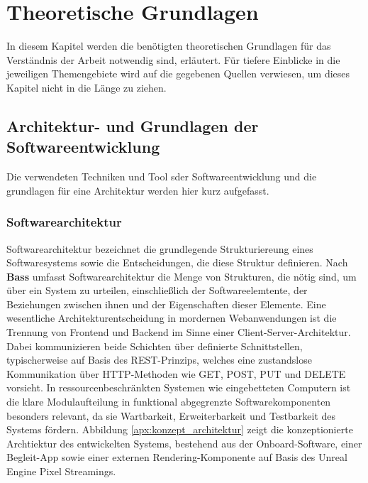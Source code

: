 

\chapter{Theoretische Grundlagen}
\label{ch:theogrundlagen}

In diesem Kapitel werden die benötigten theoretischen Grundlagen für das Verständnis der Arbeit notwendig sind, erläutert. Für tiefere Einblicke in die jeweiligen Themengebiete wird auf die gegebenen Quellen verwiesen, um dieses Kapitel nicht in die Länge zu ziehen.

\section{Architektur- und Grundlagen der Softwareentwicklung}
\label{sec:SoftwarearchiGrund}
Die verwendeten Techniken und Tool sder Softwareentwicklung und die grundlagen für eine Architektur werden hier kurz aufgefasst.

\subsection{Softwarearchitektur}
\label{subsec:Softwarearchitektur}
Softwarearchitektur bezeichnet die grundlegende Strukturiereung eines Softwaresystems sowie die Entscheidungen, die diese Struktur definieren. Nach \textbf{Bass} umfasst Softwarearchitektur die Menge von Strukturen, die nötig sind, um über ein System zu urteilen, einschließlich der Softwareelemtente, der Beziehungen zwischen ihnen und der Eigenschaften dieser Elemente.\autocite[vgl. S.2f]{bassSoftwareArchitecturePractice2022} Eine wesentliche Architekturentscheidung in mordernen Webanwendungen ist die Trennung von Frontend und Backend im Sinne einer Client-Server-Architektur. Dabei kommunizieren beide Schichten über definierte Schnittstellen, typischerweise auf Basis des \ac{REST}-Prinzips, welches eine zustandslose Kommunikation über HTTP-Methoden wie GET, POST, PUT und DELETE vorsieht.\autocite[vgl. Chapter 5]{fieldingArchitecturalStylesDesign}
\newpage
In ressourcenbeschränkten Systemen wie eingebetteten Computern ist die klare Modulaufteilung in funktional abgegrenzte Softwarekomponenten besonders relevant, da sie Wartbarkeit, Erweiterbarkeit und Testbarkeit des Systems fördern. Abbildung \ref{apx:konzept_architektur} zeigt die konzeptionierte Archtiektur des entwickelten Systems, bestehend aus der Onboard-Software, einer Begleit-App sowie einer externen Rendering-Komponente auf Basis des Unreal Engine Pixel Streamings.

